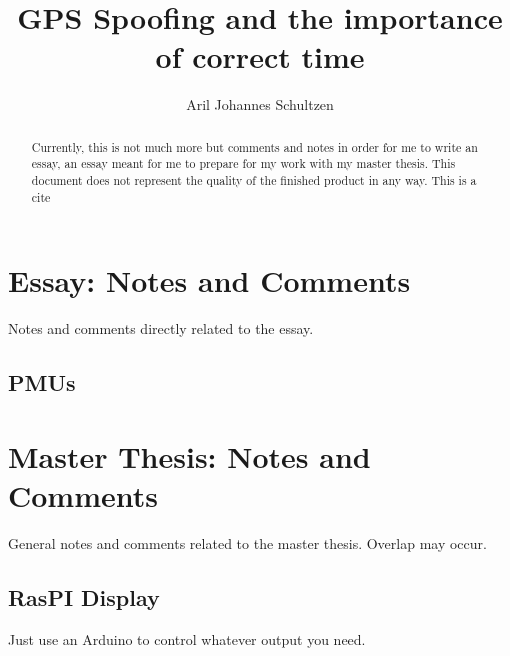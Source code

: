 \documentclass[12pt,english,a4paper]{article}
\title{GPS Spoofing and the importance of correct time}
\author{Aril Johannes Schultzen}
\begin{document}
\maketitle
\thispagestyle{empty}
\setcounter{page}{0}
\newpage
\tableofcontents
\thispagestyle{empty}
\setcounter{page}{0}
\newpage
\thispagestyle{empty}
\setcounter{page}{0}

\begin{abstract}
Currently, this is not much more but comments and notes in order for me to write an essay, an essay meant for me to prepare for my work with my master thesis. This document does not represent the quality of the finished product in any way. This is a cite \cite{KandR}
\end{abstract}

\newpage
\clearpage
\setcounter{page}{1}

\section{Essay: Notes and Comments}
Notes and comments directly related to the essay.

\subsection{PMUs}


\section{Master Thesis: Notes and Comments}
General notes and comments related to the master thesis. Overlap may occur.

\subsection{RasPI Display}
Just use an Arduino to control whatever output you need.
\newpage

\printbibliography[title={Complete Bibliography},heading=bibintoc]
\end{document}
